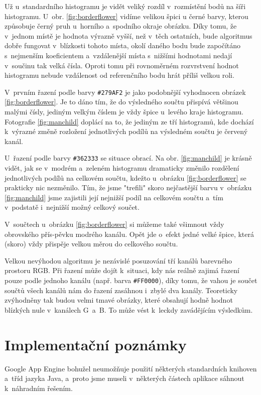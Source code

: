 \documentclass[12pt,oneside,a4paper]{article}
\begin{document}
Už u~standardního histogramu je vidět veliký rozdíl v~rozmístění bodů na šíři histogramu. U~obr. \ref{fig:borderflower} vidíme velikou špici u černé barvy, kterou způsobuje černý pruh u~horního a~spodního okraje obrázku. Díky tomu, že v~jednom místě je hodnota výrazně vyšší, než v~těch ostatních, bude algoritmus dobře fungovat v~blízkosti tohoto místa, okolí daného bodu bude započítáno s~nejmenším koeficientem a~vzdálenější místa s~nižšími hodnotami nedají v~součinu tak velká čísla. Oproti tomu při rovnoměrném rozvrstvení hodnot histogramu nebude vzdálenost od referenčního bodu hrát příliš velkou roli.

V~prvním řazení podle barvy \verb|#279AF2| je jako podobnější vyhodnocen obrázek \ref{fig:borderflower}. Je to dáno tím, že do výsledného součtu přispívá většinou malými čísly, jediným velkým číslem je vždy špice u~levého kraje histogramu. Fotografie \ref{fig:manchild} doplácí na to, že jediným ze tří histogramů, kde dochází k~výrazné změně rozložení jednotlivých podílů na výsledném součtu je červený kanál.

U~řazení podle barvy \verb|#362333| se situace obrací. Na obr. \ref{fig:manchild} je krásně vidět, jak se v~modrém a~zeleném histogramu dramaticky změnilo rozdělení jednotlivých podílů na celkovém součtu, kdežto u~obrázku \ref{fig:borderflower} se prakticky nic nezměnilo. Tím, že jsme "trefili" skoro nejčastější barvu v~obrázku \ref{fig:manchild} jsme zajistili její nejnižší podíl na celkovém součtu a~tím v~podstatě i~nejnižší možný celkový součet.

V~součtech u~obrázku \ref{fig:borderflower} si můžeme také všimnout vždy obrovského přís-pěvku modrého kanálu. Opět jde o~efekt jedné velké špice, která (skoro) vždy přispěje velkou měrou do celkového součtu.

Velkou nevýhodou algoritmu je nezávislé posuzování tří kanálů barevného prostoru RGB. Při řazení může dojít k~situaci, kdy nás reálně zajimá řazení pouze podle jednoho kanálu (např. barva \verb|#FF0000|), díky tomu, že vahou je součet součtů všech kanálů nám do řazení zasáhnou i~zbylé dva kanály. Teoreticky zvýhodněny tak budou velmi tmavé obrázky, které obsahují hodně hodnot blízkých nule v~kanálech G~a~B. To může vést k~leckdy zavádějícím výsledkům.

\section{Implementační poznámky}

Google App Engine bohužel neumožňuje použití některých standardních knihoven a~tříd jazyka Java, a~proto jsme museli v~některých částech aplikace sáhnout k~náhradním řešením.
\end{document}

